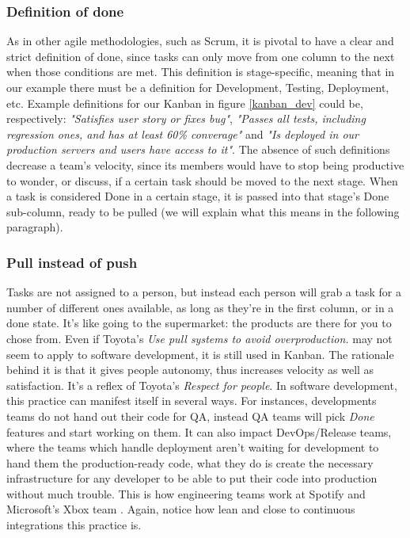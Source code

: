 \documentclass[conference]{IEEEtran}
\begin{document}
\subsubsection{Definition of done}
As in other agile methodologies, such as Scrum, it is pivotal to have a clear
and strict definition of done, since tasks can only move from one column to the
next when those conditions are met. This definition is stage-specific, meaning
that in our example there must be a definition for Development, Testing, Deployment, etc.
Example definitions for our Kanban in figure \ref{kanban_dev} could be, respectively: \textit{"Satisfies user story or fixes bug"},
\textit{"Passes all tests, including regression ones, and has at least 60\% converage"}
and \textit{"Is deployed in our production servers and users have access to it"}.
The absence of such definitions decrease a team's velocity, since its members would
have to stop being productive to wonder, or discuss, if a certain task should be
moved to the next stage. When a task is considered Done in a certain stage, it is
passed into that stage's Done sub-column, ready to be pulled (we will explain what
this means in the following paragraph).

\subsubsection{Pull instead of push}
Tasks are not assigned to a person, but instead each person will grab a task for
a number of different ones available, as long as they're in the first column, or in a done state. It's like going
to the supermarket: the products are there for you to chose from.
Even if Toyota's \textit{Use pull systems to avoid overproduction.} may not seem
to apply to software development, it is still used in Kanban. The rationale behind
it is that it gives people autonomy, thus increases velocity as well as satisfaction.
It's a reflex of Toyota's \textit{Respect for people}.
In software development, this practice can manifest itself in several ways.
For instances, developments teams do not hand out their code for QA, instead QA teams
will pick \textit{Done} features and start working on them.
It can also impact DevOps/Release teams, where the teams which handle deployment aren't waiting
for development to hand them the production-ready code, what they do is create
the necessary infrastructure for any developer to be able to put their code into
production without much trouble. This is how engineering teams work at Spotify \cite{spotify} and Microsoft's Xbox team \cite{ericb}.
Again, notice how lean and close to continuous integrations this practice is.
\end{document}
